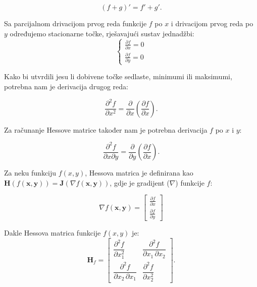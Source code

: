 \documentclass[12pt,a4paper]{report}
\begin{document}
\begin{equation}
    (f + g)' = f' + g'.
\end{equation}

Sa parcijalnom drivacijom prvog reda funkcije $f$ po $x$ i drivacijom prvog reda po $y$ određujemo stacionarne točke, rješavajući sustav jednadžbi:
\begin{equation}
    \begin{cases}
        \frac{\partial f}{\partial x} = 0 \\
        \frac{\partial f}{\partial y} = 0
    \end{cases}
\end{equation}

Kako bi utvrdili jesu li dobivene točke sedlaste, minimumi ili maksimumi, potrebna nam je derivacija drugog reda:

\begin{equation}
    \frac{\partial^2 f}{\partial x^2} = \frac{\partial}{\partial x} (\frac{\partial f}{\partial x}).
\end{equation}

Za računanje Hessove matrice također nam je potrebna derivacija $f$ po $x$ i $y$:

\begin{equation}
    \frac{\partial^2 f}{\partial x \partial y} = \frac{\partial}{\partial y} (\frac{\partial f}{\partial x}).
\end{equation}

Za neku funkciju $f(x, y)$, Hessova matrica je definirana kao
$\mathbf{H}(f(\mathbf{x, y})) = \mathbf{J}(\nabla f(\mathbf{x, y}))$,
gdje je gradijent ($\nabla$) funkcije $f$:

\begin{equation}
    \nabla f(\mathbf{x}, \mathbf{y}) = \begin{bmatrix}
        \frac{\partial f}{\partial x} \\
        \frac{\partial f}{\partial y}
    \end{bmatrix}
\end{equation}

Dakle Hessova matrica funkcije $f(x, y)$ je:
\begin{equation}
    \mathbf H_f= \begin{bmatrix}
        \dfrac{\partial^2 f}{\partial x_1^2} & \dfrac{\partial^2 f}{\partial x_1\,\partial x_2}\\
        \dfrac{\partial^2 f}{\partial x_2\,\partial x_1} & \dfrac{\partial^2 f}{\partial x_2^2}
    \end{bmatrix}.
\end{equation}
\end{document}
